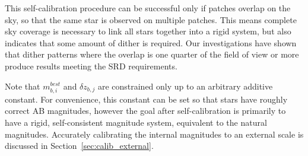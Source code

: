 \documentclass[12pt,preprint]{aastex}
\begin{document}
This self-calibration procedure can be successful only if patches
overlap on the sky, so that the same star is observed on 
multiple patches. This means complete sky coverage is necessary to
link all stars together into a rigid system, but also indicates that
some amount of dither is required. Our investigations have shown
that dither patterns where the overlap is one quarter of the field of
view or more produce results meeting the SRD requirements. 

Note that $m_{b,i}^{best}$ and $\delta z_{b,j}$ are
constrained only up to an arbitrary additive constant. For
convenience, this constant can be set so that stars have roughly
correct AB magnitudes, however the goal after self-calibration is
primarily to have a rigid, self-consistent magnitude system,
equivalent to the natural magnitudes. Accurately calibrating the internal
magnitudes to an external scale is discussed in 
Section~\ref{sec:calib_external}. 
\end{document}
